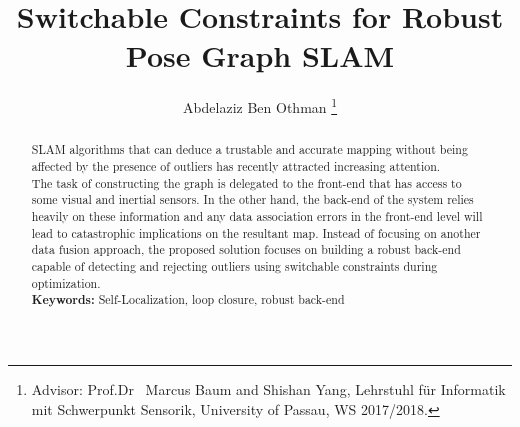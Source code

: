 \documentclass[9pt,technote]{IEEEtran}
\begin{document}
	\title{Switchable  Constraints  for  Robust  Pose  Graph  SLAM }
	\author{Abdelaziz Ben Othman 
	\thanks{Advisor: Prof.Dr ~Marcus Baum and Shishan Yang, Lehrstuhl f\"ur Informatik mit Schwerpunkt Sensorik, University of Passau, WS 2017/2018.}}
	\maketitle

\begin{abstract}
SLAM algorithms that can deduce a trustable and accurate mapping without being affected by the presence of outliers has recently attracted increasing attention.\\
The task of constructing the graph is delegated to the front-end that has access to some visual and inertial sensors.
In the other hand, the back-end of the system relies heavily on these information and any data association errors in the front-end level will lead to catastrophic implications on the resultant map.
Instead of focusing on another data fusion approach, the proposed solution focuses on building a robust back-end capable of detecting and rejecting outliers using switchable constraints during optimization.\\
\textbf{Keywords:} Self-Localization, loop closure, robust back-end 

\end{abstract}

\end{document}
